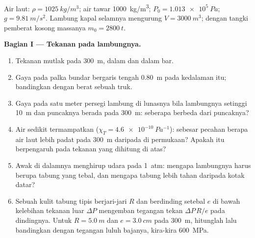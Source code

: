 \begin{problem}
\label{pb:b1:fluid-statics:1}
Air laut: $\rho = \qty{1025}{kg/m^3}$; air tawar \qty{1000}{kg/m^3};
$P_0 = \qty{1.013e5}{Pa}$; $g = \qty{9.81}{m/s^2}$. Lambung kapal selamnya
mengurung $V = \qty{3000}{m^3}$; dengan tangki pemberat kosong massanya
$m_0 = \qty{2800}{t}$.

\medskip
\noindent\textbf{Bagian I --- Tekanan pada lambungnya.}
\begin{enumerate}
  \item Tekanan mutlak pada \qty{300}{m}, dalam  dan dalam bar.
  \item Gaya pada palka bundar bergaris tengah \qty{0.80}{m} pada kedalaman itu;
        bandingkan dengan berat sebuah truk.
  \item Gaya pada satu meter persegi lambung di lunasnya bila lambungnya
        setinggi \qty{10}{m} dan puncaknya berada pada \qty{300}{m}: seberapa berbeda dari
        puncaknya?
  \item Air sedikit termampatkan ($\chi_T = \qty{4.6e-10}{Pa^{-1}}$):
        sebesar pecahan berapa air laut lebih padat pada \qty{300}{m} daripada di
        permukaan? Apakah itu berpengaruh pada tekanan yang dihitung di atas?
  \item Awak di dalamnya menghirup udara pada \qty{1}{atm}: mengapa lambungnya
        harus berupa tabung yang tebal, dan mengapa tabung lebih tahan
        daripada kotak datar?
  \item Sebuah kulit tabung tipis berjari-jari $R$ dan berdinding setebal $e$
        di bawah kelebihan tekanan luar $\Delta P$ mengemban tegangan
        tekan $\Delta P\,R/e$ pada dindingnya. Untuk $R = \qty{5.0}{m}$ dan
        $e = \qty{3.0}{cm}$ pada \qty{300}{m}, hitunglah lalu bandingkan dengan
        tegangan luluh bajanya, kira-kira \qty{600}{MPa}.
\end{enumerate}


\end{problem}
